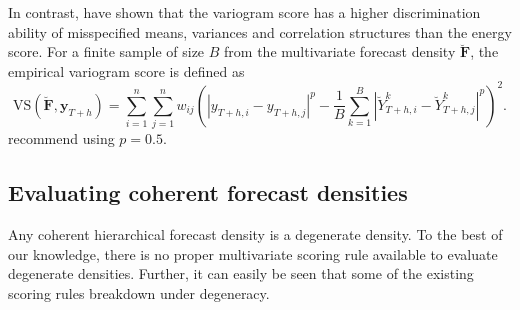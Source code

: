\documentclass[a4paper, 11pt]{article}
\begin{document}
In contrast, \citet{SCHEUERER2015} have shown that the variogram score has a higher discrimination ability of misspecified means, variances and correlation structures than the energy score. For a finite sample of size $B$ from the multivariate forecast density $\breve{\bm{F}}$, the empirical variogram score is defined as
\begin{equation}
\text{VS}(\breve{\bm{F}}, \bm{y}_{T+h}) = \displaystyle\sum_{i=1}^{n}\displaystyle\sum_{j=1}^{n}w_{ij}\left(|y_{T+h,i} - y_{T+h,j}|^p - \frac{1}{B} \displaystyle\sum_{k=1}^{B} |\breve{Y}^k_{T+h,i}-\breve{Y}^k_{T+h,j}|^p\right)^2.
\end{equation}
\citet{SCHEUERER2015} recommend using $p=0.5$. 



%

\subsection{Evaluating coherent forecast densities}

Any coherent hierarchical forecast density is a degenerate density. To the best of our knowledge, there is no proper multivariate scoring rule available to evaluate degenerate densities. Further, it can easily be seen that some of the existing scoring rules breakdown under degeneracy. 
\end{document}

